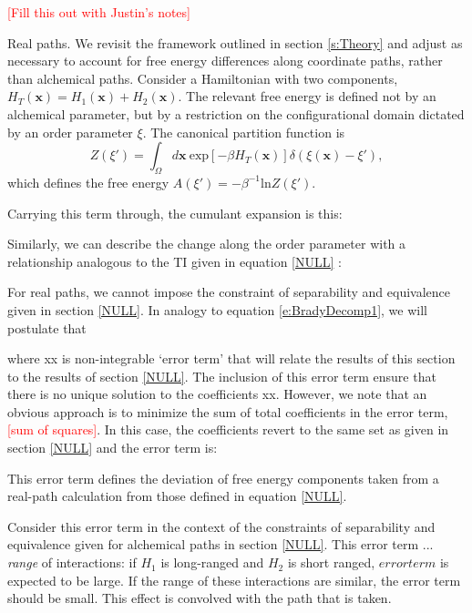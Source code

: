 \documentclass[%
 preprint,
 amsmath,amssymb,
 aps,
]{revtex4-1}
\newcommand{\warning}[1]{{\textsf{{\textcolor{red}{{[#1]}{}}}}}}
\renewcommand{\vec}[1]{{\mathbf{#1}}}
\begin{document}
 \warning{Fill this out with Justin's notes}
 
 Real paths. We revisit the framework outlined in section \ref{s:Theory} and adjust as necessary to account for free energy differences along coordinate paths, rather than alchemical paths. Consider a Hamiltonian with two components, 
 $H_{T} \left( \vec{x} \right) = H_1 \left( \vec{x} \right) + H_2 \left( \vec{x} \right)$.  The relevant free energy is defined not by an alchemical parameter, but by a restriction on the configurational domain dictated by an order parameter $\xi$.  The canonical partition function is
 \begin{equation}
 Z \left( \xi' \right) = \int_{\Omega} d \vec{x}  \:  \mbox{exp} 
 \left[ -\beta H_T \left(\vec{x} \right) \right] 
 \delta \left( \xi \left( \vec{x} \right) - \xi'\right),
 \label{e:RealZ}
 \end{equation}
 which defines the free energy $A \left( \xi'\right) = -\beta^{-1} \mbox{ln} Z \left( \xi' \right)$. 
 
 Carrying this term through, the cumulant expansion is this:
 
 Similarly, we can describe the change along the order parameter with a relationship analogous to
 the TI given in equation \ref{NULL} \cite{NULL}: 
 
For real paths, we cannot impose the constraint of separability and equivalence given in section \ref{NULL}.  In analogy
to equation \ref{e:BradyDecomp1}, we will postulate that

where xx is non-integrable `error term' that will relate the
results of this section to the results of section \ref{NULL}.  The inclusion of this error term ensure that there is no 
unique solution to the coefficients xx.  However, we note that an obvious approach is to minimize the sum of total coefficients in the error term, \warning{sum of squares}.  In this case, the coefficients revert to the same set as given in section \ref{NULL} and the error term is:

This error term defines the deviation of free energy components taken from a real-path calculation from those defined in equation \ref{NULL}.  
 
 Consider this error term in the context of the constraints of separability and equivalence given for alchemical paths in section \ref{NULL}.  This error term ... \textit{range} of interactions:  if $H_1$ is long-ranged and $H_2$ is short ranged, $error term$ is expected to be large.  If the range of these interactions are similar, the error term should be small.  This 
 effect is convolved with the path that is taken. 
 
\end{document}
